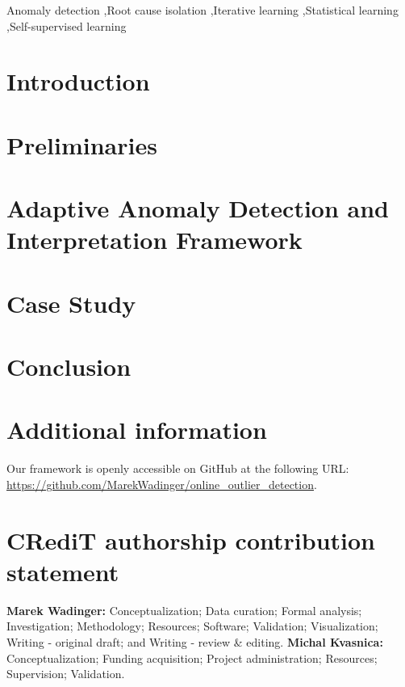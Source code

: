\documentclass[preprint,12pt,authoryear]{elsarticle}
\begin{document}
\begin{frontmatter}
    \begin{keyword}
        Anomaly detection \sep Root cause isolation \sep Iterative learning \sep Statistical learning \sep Self-supervised learning
    \end{keyword}

\end{frontmatter}

\linenumbers

\section{Introduction}
\label{Introduction}


\section{Preliminaries}
\label{Preliminaries}


\clearpage
\section{Adaptive Anomaly Detection and Interpretation Framework}
\label{Proposed Method}


\clearpage
\section{Case Study}
\label{Case Study}


\section{Conclusion}
\label{Conclusion}


\section*{Additional information}
Our framework is openly accessible on GitHub at the following URL: \url{https://github.com/MarekWadinger/online_outlier_detection}.

\section*{CRediT authorship contribution statement}
\textbf{Marek Wadinger:} Conceptualization; Data curation; Formal analysis; Investigation; Methodology; Resources; Software; Validation; Visualization; Writing - original draft; and Writing - review \& editing. \textbf{Michal Kvasnica:} Conceptualization; Funding acquisition; Project administration; Resources; Supervision; Validation.
\end{document}
